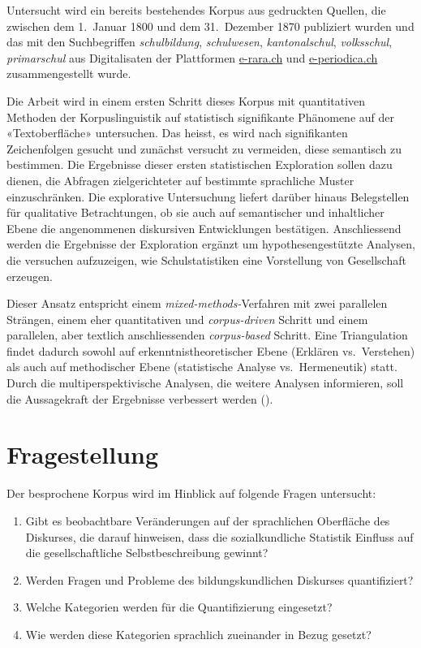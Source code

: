Untersucht wird ein bereits bestehendes Korpus aus gedruckten Quellen, die zwischen dem 1.~Januar 1800 und dem 31.~Dezember 1870 publiziert wurden und das mit den Suchbegriffen \textit{schulbildung}, \textit{schulwesen}, \textit{kantonalschul}, \textit{volksschul}, \textit{primarschul} aus Digitalisaten der Plattformen \href{https://www.e-rara.ch/}{e-rara.ch} und \href{https://e-periodica.ch}{e-periodica.ch} zusammengestellt wurde. 

Die Arbeit wird in einem ersten Schritt dieses Korpus mit quantitativen Methoden der Korpuslinguistik auf statistisch signifikante Phänomene auf der «Textoberfläche» untersuchen. Das heisst, es wird nach signifikanten Zeichenfolgen gesucht und zunächst versucht zu vermeiden, diese semantisch zu bestimmen. Die Ergebnisse dieser ersten statistischen Exploration sollen dazu dienen, die Abfragen zielgerichteter auf bestimmte sprachliche Muster einzuschränken. Die explorative Untersuchung liefert darüber hinaus Belegstellen für qualitative Betrachtungen, ob sie auch auf semantischer und inhaltlicher Ebene die angenommenen diskursiven Entwicklungen bestätigen. Anschliessend werden die Ergebnisse der Exploration ergänzt um hypothesengestützte Analysen, die versuchen aufzuzeigen, wie Schulstatistiken eine Vorstellung von Gesellschaft erzeugen.

Dieser Ansatz entspricht einem \textit{mixed-methods-}Verfahren mit zwei parallelen Strängen, einem eher quantitativen und \textit{corpus-driven} Schritt und einem parallelen, aber textlich anschliessenden \textit{corpus-based} Schritt. Eine Triangulation findet dadurch sowohl auf erkenntnistheoretischer Ebene (Erklären vs.~Verstehen) als auch auf methodischer Ebene (statistische Analyse vs.~Hermeneutik) statt. Durch die multiperspektivische Analysen, die weitere Analysen informieren, soll die Aussagekraft der Ergebnisse verbessert werden (\cite[139]{dreesen_diskurslinguistik_2019}).

\pagebreak

\section{Fragestellung}\label{Fragestellung}

Der besprochene Korpus wird im Hinblick auf folgende Fragen untersucht:

\begin{enumerate}
    \item Gibt es beobachtbare Veränderungen auf der sprachlichen Oberfläche des Diskurses, die darauf hinweisen, dass die sozialkundliche Statistik Einfluss auf die gesellschaftliche Selbstbeschreibung gewinnt?
    \item Werden Fragen und Probleme des bildungskundlichen Diskurses quantifiziert?
    \item Welche Kategorien werden für die Quantifizierung eingesetzt?
    \item Wie werden diese Kategorien sprachlich zueinander in Bezug gesetzt? 
\end{enumerate}

